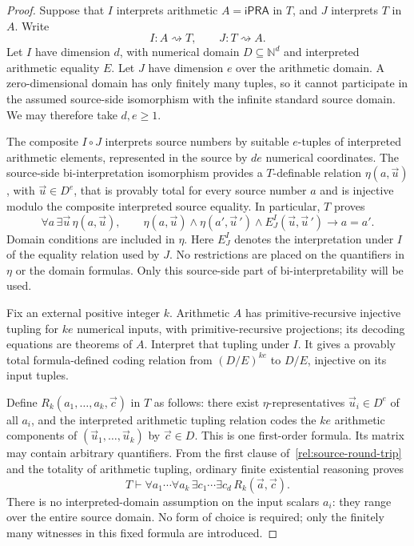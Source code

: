 \begin{proof}
Suppose that $I$ interprets arithmetic $A=\mathsf{iPRA}$ in $T$, and
$J$ interprets $T$ in $A$. Write
\[
                          I:A\rightsquigarrow T,
                          \qquad J:T\rightsquigarrow A.
\]
Let $I$ have dimension $d$, with numerical domain
$D\subseteq\mathbb N^d$ and interpreted arithmetic equality $E$.
Let $J$ have dimension $e$ over the arithmetic domain. A zero-dimensional
domain has only finitely many tuples, so it cannot participate in the
assumed source-side isomorphism with the infinite standard source
domain. We may therefore take $d,e\ge1$.

The composite $I\circ J$ interprets source numbers by suitable
$e$-tuples of interpreted arithmetic elements, represented in the
source by $de$ numerical coordinates. The source-side bi-interpretation
isomorphism provides a $T$-definable relation $\eta(a,\vec u)$, with
$\vec u\in D^e$, that is provably total for every source number $a$
and is injective modulo the composite interpreted source equality.
In particular, $T$ proves
\[
 \forall a\,\exists\vec u\,\eta(a,\vec u),
 \qquad
 \eta(a,\vec u)\wedge\eta(a',\vec u\,')\wedge
       E_{J}^{I}(\vec u,\vec u\,')\longrightarrow a=a'.
 \tag{Source round trip}\label{rel:source-round-trip}
\]
Domain conditions are included in $\eta$. Here $E_{J}^{I}$ denotes
the interpretation under $I$ of the equality relation used by $J$.
No restrictions are placed on the quantifiers in $\eta$ or the domain
formulas. Only this source-side part of bi-interpretability will be used.

Fix an external positive integer $k$. Arithmetic $A$ has
primitive-recursive injective tupling for $ke$ numerical inputs, with
primitive-recursive projections; its decoding equations are theorems
of $A$. Interpret that tupling under $I$. It gives a provably total
formula-defined coding relation from $(D/E)^{ke}$ to $D/E$, injective
on its input tuples.

Define $R_k(a_1,\ldots,a_k,\vec c)$ in $T$ as follows: there exist
$\eta$-representatives $\vec u_i\in D^e$ of all $a_i$, and the
interpreted arithmetic tupling relation codes the $ke$ arithmetic
components of $(\vec u_1,\ldots,\vec u_k)$ by $\vec c\in D$.
This is one first-order formula. Its matrix may contain arbitrary
quantifiers. From the first clause of~\eqref{rel:source-round-trip} and
the totality of arithmetic tupling, ordinary finite existential
reasoning proves
\[
                      T\vdash\forall a_1\cdots\forall a_k\,
                         \exists c_1\cdots\exists c_d\,
                              R_k(\vec a,\vec c).
                      \tag{Compression totality}\label{rel:compression-totality}
\]
There is no interpreted-domain assumption on the input scalars $a_i$:
they range over the entire source domain. No form of choice is required;
only the finitely many witnesses in this fixed formula are introduced.


\end{proof}
